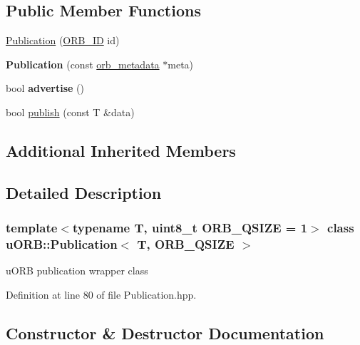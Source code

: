 \subsection*{Public Member Functions}
\begin{DoxyCompactItemize}
\item 
\hyperlink{classuORB_1_1Publication_a420de66872fa317bed932a5e54698323}{Publication} (\hyperlink{uORB_8h_a96af5434ec1acdf24287bd7851b0413f}{O\+R\+B\+\_\+\+ID} id)
\item 
\mbox{\label{classuORB_1_1Publication_a0bcd30a2e20035adcd7b053e8e4dbe4b}} 
{\bfseries Publication} (const \hyperlink{structorb__metadata}{orb\+\_\+metadata} $\ast$meta)
\item 
\mbox{\label{classuORB_1_1Publication_a4af3fc463148dec3ddfb597824cc8c37}} 
bool {\bfseries advertise} ()
\item 
bool \hyperlink{classuORB_1_1Publication_a1c4a9ef046f8b0c1ade8a226e36f2892}{publish} (const T \&data)
\end{DoxyCompactItemize}
\subsection*{Additional Inherited Members}


\subsection{Detailed Description}
\subsubsection*{template$<$typename T, uint8\+\_\+t O\+R\+B\+\_\+\+Q\+S\+I\+ZE = 1$>$\newline
class u\+O\+R\+B\+::\+Publication$<$ T, O\+R\+B\+\_\+\+Q\+S\+I\+Z\+E $>$}

u\+O\+RB publication wrapper class 

Definition at line 80 of file Publication.\+hpp.



\subsection{Constructor \& Destructor Documentation}
\mbox{\label{classuORB_1_1Publication_a420de66872fa317bed932a5e54698323}} 
